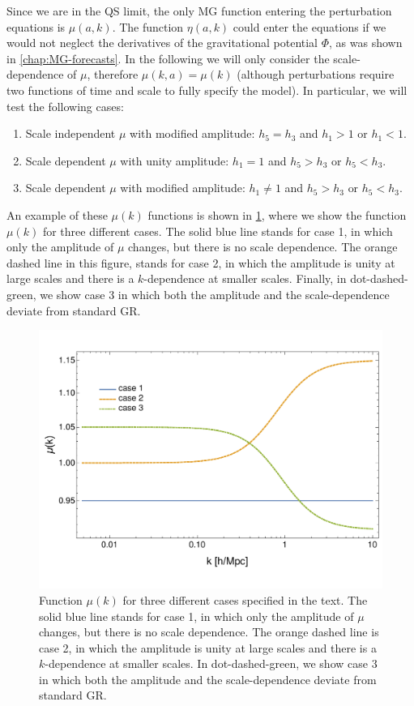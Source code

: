 Since we are in the QS limit, the only MG function entering the perturbation equations
is $\mu(a,k)$. The function $\eta(a,k)$ could enter the equations
if we would not neglect the derivatives of the gravitational potential $\Phi$, as 
was shown in \cref{chap:MG-forecasts}.
In the following we will only consider the scale-dependence of $\mu$, therefore $\mu(k,a)=\mu(k)$ (although perturbations require
two functions of time and scale to fully specify the model). In particular,
we will test the following cases: 
\begin{enumerate} \label{enum:enumeration-cases}
	\item Scale independent $\mu$ with modified amplitude: $h_{5}=h_{3}$ and
	$h_{1}>1$ or $h_{1}<1$. 
	\item Scale dependent $\mu$ with unity amplitude: $h_{1}=1$ and $h_{5}>h_{3}$
	or $h_{5}<h_{3}$. 
	\item Scale dependent $\mu$ with modified amplitude: $h_{1}\neq1$ and
	$h_{5}>h_{3}\mbox{ or }h_{5}<h_{3}$. 
\end{enumerate}
An example of these $\mu(k)$ functions is shown in \cref{fig:Mu(k)function}, where we show the 
function $\mu(k)$ for three different cases. The solid blue line stands for case 1, in which only the amplitude of
$\mu$ changes, but there is no scale dependence. The orange dashed line in this figure, stands for case 2, 
in which the amplitude is unity at large scales and there is a $k$-dependence at smaller scales. 
Finally, in dot-dashed-green, we show case 3 in which both the amplitude and the scale-dependence deviate from standard GR.
\begin{figure}[htbp]
	\centering
	\includegraphics[width=0.75\linewidth]{Chapters/resummation-plots/mu-of-k-plots-3cases.pdf}
	\caption[MG function $\mu(k)$]{Function $\mu(k)$ for three different cases specified in the text. The solid blue line stands for case 1, in which only the amplitude of
	$\mu$ changes, but there is no scale dependence. The orange dashed line is case 2, 
in which the amplitude is unity at large scales and there is a $k$-dependence at smaller scales. In dot-dashed-green, we show case 3 in which both the amplitude and the scale-dependence deviate from standard GR.}
	\label{fig:Mu(k)function}
\end{figure}

